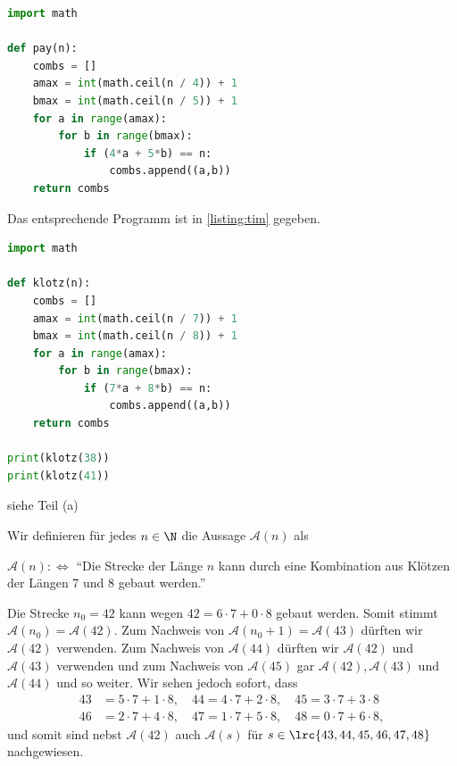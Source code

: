 \begin{myanswer}[myexercise:0208]
	\begin{lstlisting}[language=Python,caption=Dollar-Betrag auszahlen]
import math

def pay(n):
    combs = []
    amax = int(math.ceil(n / 4)) + 1
    bmax = int(math.ceil(n / 5)) + 1
    for a in range(amax):
        for b in range(bmax):
            if (4*a + 5*b) == n:
                combs.append((a,b))
    return combs
\end{lstlisting}
\end{myanswer}
\clearpage
\begin{myanswer}[myexercise:0210]
	\begin{aenum}
		\item Das entsprechende Programm ist in \cref{listing:tim} gegeben.
		\begin{lstlisting}[language=Python,caption=Bauklötze,label=listing:tim]
import math

def klotz(n):
    combs = []
    amax = int(math.ceil(n / 7)) + 1
    bmax = int(math.ceil(n / 8)) + 1
    for a in range(amax):
        for b in range(bmax):
            if (7*a + 8*b) == n:
                combs.append((a,b))
    return combs

print(klotz(38))
print(klotz(41))
\end{lstlisting}
		\item siehe Teil (a)
		\item
		Wir definieren für jedes $n\in\N$ die Aussage $\mathcal{A}(n)$ als
		\begin{center}
			$\mathcal{A}(n) :\iff $ \enquote{Die Strecke der Länge $n$ kann durch eine Kombination aus Klötzen der Längen 7 und 8 gebaut werden.}
		\end{center}
		Die Strecke $n_0 = 42$ kann wegen $42 = 6\cdot 7 + 0\cdot 8$ gebaut werden. Somit stimmt $\mathcal{A}(n_0)=\mathcal{A}(42)$. Zum Nachweis von $\mathcal{A}(n_0+1)=\mathcal{A}(43)$ dürften wir $\mathcal{A}(42)$ verwenden. Zum Nachweis von $\mathcal{A}(44)$ dürften wir $\mathcal{A}(42)$ und $\mathcal{A}(43)$ verwenden und zum Nachweis von $\mathcal{A}(45)$ gar $\mathcal{A}(42), \mathcal{A}(43)$ und $\mathcal{A}(44)$ und so weiter. Wir sehen jedoch sofort, dass
		\begin{align*}
			43 & = 5\cdot 7 + 1\cdot 8, \quad 44 = 4\cdot 7 + 2\cdot 8, \quad 45 = 3\cdot 7 + 3\cdot 8  \\
			46 & = 2\cdot 7 + 4\cdot 8, \quad 47 = 1\cdot 7 + 5\cdot 8, \quad 48 = 0\cdot 7 + 6\cdot 8,
		\end{align*}
		und somit sind nebst $\mathcal{A}(42)$ auch $\mathcal{A}(s)$ für $s\in\lrc{43,44,45,46,47,48}$ nachgewiesen.


\end{aenum}
\end{myanswer}
